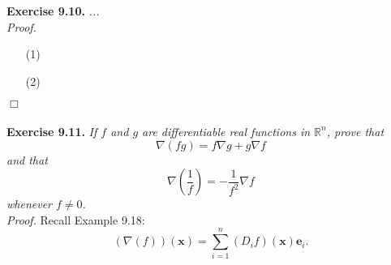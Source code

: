 \documentclass{article}
\begin{document}



\textbf{Exercise 9.10.}
\emph{...} \\

\emph{Proof.}
\begin{enumerate}
\item[(1)]
\item[(2)]

\end{enumerate}
$\Box$ \\\\






\textbf{Exercise 9.11.}
\emph{If $f$ and $g$ are differentiable real functions in $\mathbb{R}^n$,
prove that
\[
  \nabla(fg) = f \nabla g + g \nabla f
\]
and that
\[
  \nabla\left(\frac{1}{f}\right) = -\frac{1}{f^2} \nabla f
\]
whenever $f \neq 0$.} \\

\emph{Proof.}
Recall Example 9.18:
\[
  (\nabla(f))(\mathbf{x}) = \sum_{i=1}^{n}(D_i f)(\mathbf{x})\mathbf{e}_i.
\]
\end{document}
